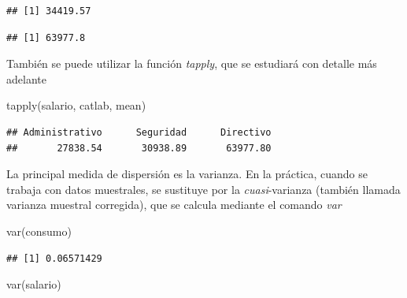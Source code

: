 \documentclass[
]{book}
\newenvironment{Shaded}{\begin{snugshade}}{\end{snugshade}}
\newcommand{\FunctionTok}[1]{\textcolor[rgb]{0.00,0.00,0.00}{#1}}
\newcommand{\NormalTok}[1]{#1}
\newcommand{\SpecialCharTok}[1]{\textcolor[rgb]{0.00,0.00,0.00}{#1}}
\newcommand{\StringTok}[1]{\textcolor[rgb]{0.31,0.60,0.02}{#1}}
\theoremstyle{break}
\theoremstyle{nonumberplain}
\begin{document}
\begin{verbatim}
## [1] 34419.57
\end{verbatim}

\begin{Shaded}
\end{Shaded}

\begin{verbatim}
## [1] 63977.8
\end{verbatim}

También se puede utilizar la función \emph{tapply}, que se estudiará
con detalle más adelante

\begin{Shaded}
\begin{Highlighting}[]
\FunctionTok{tapply}\NormalTok{(salario, catlab, mean)}
\end{Highlighting}
\end{Shaded}

\begin{verbatim}
## Administrativo      Seguridad      Directivo 
##       27838.54       30938.89       63977.80
\end{verbatim}

La principal medida de dispersión es la varianza. En la práctica, cuando
se trabaja con datos muestrales, se sustituye por la \emph{cuasi}-varianza
(también llamada varianza muestral corregida), que se calcula mediante
el comando \emph{var}

\begin{Shaded}
\begin{Highlighting}[]
\FunctionTok{var}\NormalTok{(consumo)}
\end{Highlighting}
\end{Shaded}

\begin{verbatim}
## [1] 0.06571429
\end{verbatim}

\begin{Shaded}
\begin{Highlighting}[]
\FunctionTok{var}\NormalTok{(salario)}
\end{Highlighting}
\end{Shaded}
\end{document}

